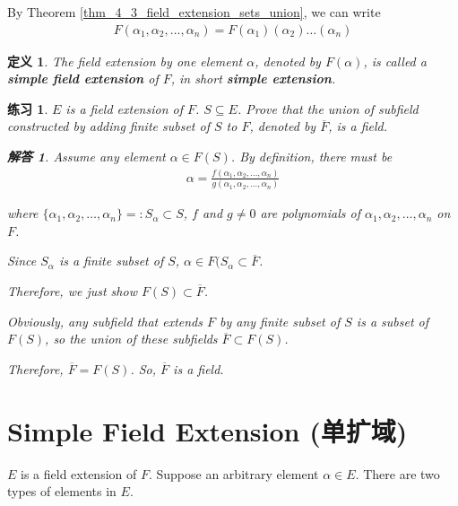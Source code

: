 \documentclass[utf8]{ctexbook}
\newtheorem{definition}{定义}[section]
\newtheorem{exercise}{练习}[section]
\newtheorem*{soln}{解答}
\begin{document}
By Theorem \ref{thm_4_3_field_extension_sets_union}, we can write
\begin{align*}
F(\alpha_1, \alpha_2, \ldots, \alpha_n) = F(\alpha_1)(\alpha_2) \ldots (\alpha_n)
\end{align*}

\begin{definition}\label{def_simple_extension}
The field extension by one element $\alpha$, denoted by $F(\alpha)$, is called a \textbf{simple field extension} of $F$, in short \textbf{simple extension}.
\end{definition}


\begin{exercise}
$E$ is a field extension of $F$. $S \subseteq E$. Prove that the union of subfield constructed by adding finite subset of $S$ to $F$, denoted by $\overline{F}$, is a field.

\begin{soln}
Assume any element $\alpha \in F(S)$. By definition, there must be
\begin{align*}
\alpha = \frac{f(\alpha_1, \alpha_2, \ldots, \alpha_n)}{g(\alpha_1, \alpha_2, \ldots, \alpha_n)}
\end{align*}

where $\{ \alpha_1, \alpha_2, \ldots, \alpha_n \} =: S_{\alpha} \subset S$, $f$ and $g\neq 0$ are polynomials of $\alpha_1, \alpha_2, \ldots, \alpha_n$ on $F$. 

Since $S_{\alpha}$ is a finite subset of $S$, $\alpha \in F(S_{\alpha} \subset \overline{F}$. 

Therefore, we just show $F(S) \subset \overline{F}$.

Obviously, any subfield that extends $F$ by any finite subset of $S$ is a subset of $F(S)$, so the union of these subfields $\overline{F} \subset F(S)$.

Therefore, $\overline{F} = F(S)$. So, $\overline{F}$ is a field. 
\end{soln}

\end{exercise}




\section{Simple Field Extension (单扩域)}

$E$ is a field extension of $F$. Suppose an arbitrary element $\alpha \in E$. There are two types of elements in $E$.
\end{document}
